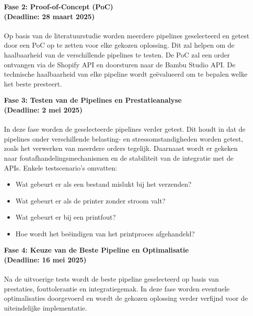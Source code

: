 \textbf{Fase 2: Proof-of-Concept (PoC)}\\
\textbf{(Deadline: 28 maart 2025)}\\\\
Op basis van de literatuurstudie worden meerdere pipelines geselecteerd en getest door een PoC op te zetten voor elke gekozen oplossing. Dit zal helpen om de haalbaarheid van de verschillende pipelines te testen. De PoC zal een order ontvangen via de Shopify API en doorsturen naar de Bambu Studio API. De technische haalbaarheid van elke pipeline wordt geëvalueerd om te bepalen welke het beste presteert.
\vspace{1em}

\textbf{Fase 3: Testen van de Pipelines en Prestatieanalyse}\\
\textbf{(Deadline: 2 mei 2025)}\\\\
In deze fase worden de geselecteerde pipelines verder getest. Dit houdt in dat de pipelines onder verschillende belasting- en stressomstandigheden worden getest, zoals het verwerken van meerdere orders tegelijk. Daarnaast wordt er gekeken naar foutafhandelingsmechanismen en de stabiliteit van de integratie met de APIs. Enkele testscenario's omvatten: 
\begin{itemize}
     \item Wat gebeurt er als een bestand mislukt bij het verzenden?
      \item Wat gebeurt er als de printer zonder stroom valt?
       \item Wat gebeurt er bij een printfout?
        \item Hoe wordt het beëindigen van het printproces afgehandeld? 
\end{itemize}
\vspace{1em}

\textbf{Fase 4: Keuze van de Beste Pipeline en Optimalisatie}\\
\textbf{(Deadline: 16 mei 2025)}\\\\
Na de uitvoerige tests wordt de beste pipeline geselecteerd op basis van prestaties, fouttolerantie en integratiegemak. In deze fase worden eventuele optimalisaties doorgevoerd en wordt de gekozen oplossing verder verfijnd voor de uiteindelijke implementatie.

